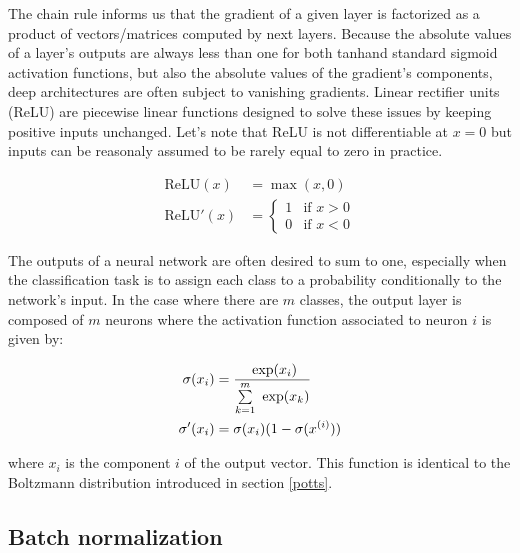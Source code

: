         The chain rule informs us that the gradient of a given layer is factorized as a product of vectors/matrices computed by next layers.
        Because the absolute values of a layer's outputs are always less than one for both tanhand standard
        sigmoid activation functions, but also the absolute values of the gradient's components,
        deep architectures are often subject to vanishing gradients. Linear rectifier units (ReLU) are piecewise linear functions designed to solve
        these issues by keeping positive inputs unchanged.
        Let's note that ReLU is not differentiable at $x = 0$ but inputs can be reasonaly assumed to be rarely equal to zero in practice.

        \begin{equation}
            \begin{split}
                \text{ReLU}(x) & = \max{(x, 0)} \\
                \text{ReLU}'(x) & =
                \begin{cases}
                    1 & \text{if } x > 0 \\
                    0 & \text{if } x < 0
                \end{cases}
            \end{split}
        \end{equation}

        The outputs of a neural network are often desired to sum to one,
        especially when the classification task is to assign each class to a probability
        conditionally to the network's input.
        In the case where there are $m$ classes, the output layer is composed of $m$ neurons where the activation
        function associated to neuron $i$ is given by:

        \begin{equation}
            \begin{split}
                \sigma(x_i) & = \frac{\text{ exp}(x_i)}{\sum\limits_{k=1}^m \text{ exp}(x_k)} \\
                \sigma'(x_i) & = \sigma(x_i) (1 - \sigma(x^{(i)}))
            \end{split}
        \end{equation}

        where $x_i$ is the component $i$ of the output vector.
        This function is identical to the Boltzmann distribution introduced in section \ref{potts}.


    \subsection{Batch normalization} \label{batchnorm}


